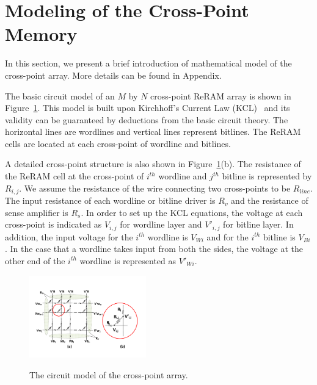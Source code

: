 \section{Modeling of the Cross-Point Memory}\label{sec:model}

In this section, we present a brief introduction of mathematical model of
the cross-point array. More details can be found in Appendix.

The basic circuit model of an $M$ by $N$ cross-point ReRAM array is shown
in Figure~\ref{fig:modeling}. This model is built upon Kirchhoff's Current
Law (KCL)~\cite{KCL} and its validity can be guaranteed by deductions from the basic
circuit theory. The horizontal lines are wordlines and vertical lines
represent bitlines. The ReRAM cells are located at each cross-point of
wordline and bitlines.

A detailed cross-point structure is also shown in Figure~\ref{fig:modeling}(b). The
resistance of the ReRAM cell at the cross-point of $i^{th}$ wordline and
$j^{th}$ bitline is represented by $R_{i,j}$. We assume the resistance of
the wire connecting two cross-points to be $R_{line}$. The input
resistance of each wordline or bitline driver is $R_v$ and the resistance
of sense amplifier is $R_s$. In order to set up the KCL equations, the
voltage at each cross-point is indicated as $V_{i,j}$ for wordline layer
and $V'_{i,j}$ for bitline layer. In addition, the input voltage for the
$i^{th}$ wordline is $V_{Wi}$ and for the $i^{th}$ bitline is $V_{Bi}$. In
the case that a wordline takes input from both the sides, the voltage at
the other end of the $i^{th}$ wordline is represented as $V'_{Wi}$.

\begin{figure}%
\centering
  \includegraphics[width=0.45\textwidth]{./figures/model_f.pdf}\\
  \caption{The circuit model of the cross-point array.}\label{fig:modeling}
  \vspace{-12pt}
\end{figure}

